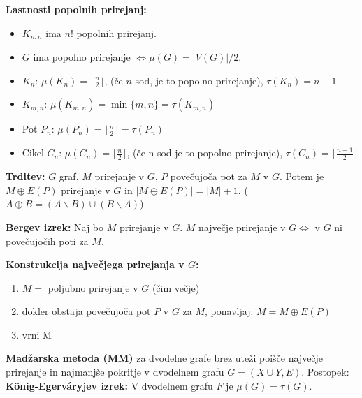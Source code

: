 \documentclass[8pt,a4paper]{amsart}
\theoremstyle{definition} %
\theoremstyle{plain} %
\begin{document}
\textbf{Lastnosti popolnih prirejanj:}
\begin{itemize}
\item $K_{n,n}$ ima $n!$ popolnih prirejanj.
\item $G$ ima popolno prirejanje $\Longleftrightarrow \mu (G) = |V(G)|/2$.
\item $K_n$: $\mu (K_n) = \lfloor \frac{n}{2} \rfloor$, (če $n$ sod, je to popolno prirejanje), $\tau (K_n) = n-1$.
\item $K_{m,n}$: $\mu (K_{m,n}) = \min \{ m,n \} = \tau (K_{m,n})$
\item Pot $P_n$: $\mu (P_n)=\lfloor \frac{n}{2} \rfloor = \tau (P_n)$
\item Cikel $C_n$: $\mu (C_n)=\lfloor \frac{n}{2} \rfloor$, (če n sod je to popolno prirejanje), $\tau (C_n) = \lfloor \frac{n+1}{2} \rfloor$
\end{itemize}

\textbf{Trditev:} $G$ graf, $M$ prirejanje v $G$, $P$ povečujoča pot za $M$ v $G$. Potem je $M \oplus E(P)$ prirejanje v $G$ in $|M\oplus E(P)|= |M|+1$. ($A \oplus B = (A\backslash B) \cup (B \backslash A)$)

\textbf{Bergev izrek:} Naj bo $M$ prirejanje v $G$. $M$ največje prirejanje v $G \Longleftrightarrow$ v $G$ ni povečujočih poti za $M$.

\textbf{Konstrukcija največjega prirejanja v $G$:}
\begin{enumerate}[1.]
\item $M=$ poljubno prirejanje v $G$ (čim večje)
\item \underline{dokler} obstaja povečujoča pot $P$ v $G$ za $M$, \underline{ponavljaj}: $M = M \oplus E(P)$
\item vrni M
\end{enumerate}

\textbf{Madžarska metoda (MM)} za dvodelne grafe brez uteži poišče največje prirejanje in najmanjše pokritje v dvodelnem grafu $G=(X \cup Y,E)$. Postopek:
\textbf{König-Egerváryjev izrek:} V dvodelnem grafu $F$ je $\mu (G)=\tau (G).$
\end{document}
